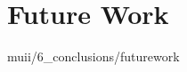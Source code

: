 \documentclass[english,epsbased,copyright,final,printable,covers,extendedindex,firstnumbered,tfm,gnuplot,loc,loe,lof,lot]{tfgtfmthesisuam}
\begin{document}
    \section{Future Work\label{SEC:FUTUREWORK}}{muii/6_conclusions/futurework}

  \appendix
\end{document}
